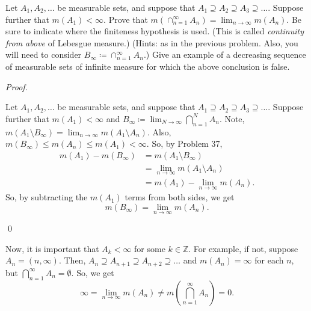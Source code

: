 \documentclass[12pt]{article}
\newenvironment{problem}[2][Problem]{\begin{trivlist}
\item[\hskip \labelsep {\bfseries #1}\hskip \labelsep {\bfseries
#2.}]}{\end{trivlist}}
\newenvironment{sol}
    {\emph{Proof.}
    }
    {
    \qed
    }
\begin{document}
\begin{problem}{38}
  Let $A_1,A_2,\dots$ be measurable sets, and suppose that $A_1 \supseteq A_2 \supseteq A_3 \supseteq \dots$. Suppose further that $m(A_1) < \infty$. Prove that $m(\cap_{n = 1}^{\infty}A_n) = \lim_{n \to \infty}m(A_n)$. Be sure to indicate where the finiteness hypothesis is used. (This is called \textit{continuity from above} of Lebesgue measure.) (Hints: as in the previous problem. Also, you will need to consider $B_{\infty} \coloneqq \cap_{n = 1}^{\infty}A_n$.) Give an example of a decreasing sequence of measurable sets of infinite measure for which the above conclusion is false. 
\end{problem}
\begin{sol}
  Let $A_1,A_2,\dots$ be measurable sets, and suppose that $A_1 \supseteq A_2 \supseteq A_3 \supseteq \dots$. Suppose further that $m(A_1) < \infty$ and $B_{\infty} \coloneqq \lim_{N \to \infty}\bigcap_{n = 1}^NA_n$. Note, $m(A_1 \setminus B_{\infty}) = \lim_{n \to \infty}m(A_1 \setminus A_n)$. Also, $m(B_{\infty}) \leq m(A_n) \leq m(A_1) < \infty$. So, by Problem 37, 
  \begin{align*}
    m(A_1) - m(B_{\infty}) &= m(A_1 \setminus B_{\infty}) \\
    &= \lim_{n \to \infty} m(A_1 \setminus A_n) \\
    &= m(A_1) - \lim_{n \to \infty} m(A_n).
  \end{align*}
  So, by subtracting the $m(A_1)$ terms from both sides, we get $$m(B_{\infty}) = \lim_{n \to \infty}m(A_n).$$
\end{sol}

Now, it is important that $A_k < \infty$ for some $k \in \mathbb{Z}$. For example, if not, suppose $A_n = (n,\infty)$. Then, $A_n \supseteq A_{n+1} \supseteq A_{n + 2} \supseteq \dots$ and $m(A_n) = \infty$ for each $n$, but $\bigcap_{n = 1}^{\infty}A_n = \emptyset$. So, we get $$\infty = \lim_{n \to \infty} m(A_n) \neq m(\bigcap_{n = 1}^{\infty}A_n) = 0.$$
\end{document}
